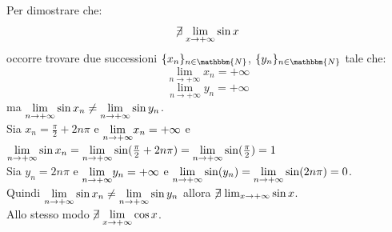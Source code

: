 \documentclass[12pt]{report}
\begin{document}
	Per dimostrare che:
	\[
	\centernot{\exists}\lim_{x \to +\infty}\sin x
	\]
	occorre trovare due successioni $\{x_n\}_{n \in \mathbbm{N}}$, $\{y_n\}_{n \in \mathbbm{N}}$ tale che:
	\[
	\lim_{n \to +\infty} x_n = +\infty
	\]
	\[
	\lim_{n \to +\infty}y_n = +\infty
	\]
	ma $\mathlarger{\lim_{n \to +\infty}}\sin x_n \neq \mathlarger{\lim_{n \to +\infty}} \sin y_n$. \\
	Sia $x_n = \frac{\pi}{2} + 2n\pi$ e $\mathlarger{\lim_{n \to +\infty}}x_n = +\infty$ e $\mathlarger{\lim_{n \to +\infty}}\sin x_n  = \mathlarger{\lim_{n \to +\infty}}\sin(\frac{\pi}{2} + 2n\pi) = \mathlarger{\lim_{n \to +\infty}}\sin(\frac{\pi}{2}) = 1$ \\
	Sia $y_n = 2n\pi$ e $\mathlarger{\lim_{n \to +\infty}}y_n = +\infty$ e $\mathlarger{\lim_{n \to +\infty}}\sin(y_n) = \mathlarger{\lim_{n \to +\infty}}\sin(2n\pi) = 0$. \\
	Quindi $\mathlarger{\lim_{n \to +\infty}}\sin x_n \neq \mathlarger{\lim_{n \to +\infty}}\sin y_n$ allora $\centernot{\exists} \lim_{x \to +\infty} \sin x$. \\
	Allo stesso modo $\centernot{\exists}\mathlarger{\lim_{x \to +\infty}}\cos x$. \\
\end{document}

